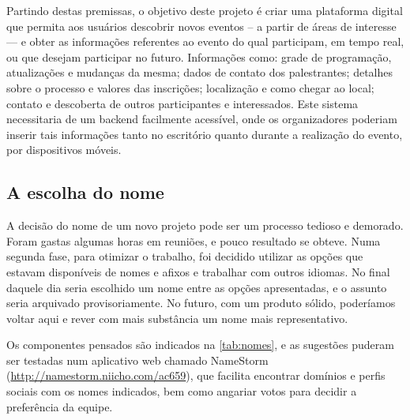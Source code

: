 \documentclass[12pt,a4paper,twoside,hyphens,english,brazil]{abntex2}
\begin{document}
Partindo destas premissas, o objetivo deste projeto é criar uma plataforma digital que permita aos usuários descobrir novos eventos -- a partir de áreas de interesse --- e obter as informações referentes ao evento do qual participam, em tempo real, ou que desejam participar no futuro. Informações como: grade de programação, atualizações e mudanças da mesma; dados de contato dos palestrantes; detalhes sobre o processo e valores das inscrições; localização e como chegar ao local; contato e descoberta de outros participantes e interessados. Este sistema necessitaria de um backend facilmente acessível, onde os organizadores poderiam inserir tais informações tanto no escritório quanto durante a realização do evento, por dispositivos móveis.



\subsection{A escolha do nome}

A decisão do nome de um novo projeto pode ser um processo tedioso e demorado. Foram gastas algumas horas em reuniões, e pouco resultado se obteve. Numa segunda fase, para otimizar o trabalho, foi decidido utilizar as opções que estavam disponíveis de nomes e afixos e trabalhar com outros idiomas. No final daquele dia seria escolhido um nome entre as opções apresentadas, e o assunto seria arquivado provisoriamente. No futuro, com um produto sólido, poderíamos voltar aqui e rever com mais substância um nome mais representativo.

Os componentes pensados são indicados na \autoref{tab:nomes}, e as sugestões puderam ser testadas num aplicativo web chamado NameStorm (\url{http://namestorm.niicho.com/ac659}), que facilita encontrar domínios e perfis sociais com os nomes indicados, bem como angariar votos para decidir a preferência da equipe.\\
\end{document}
